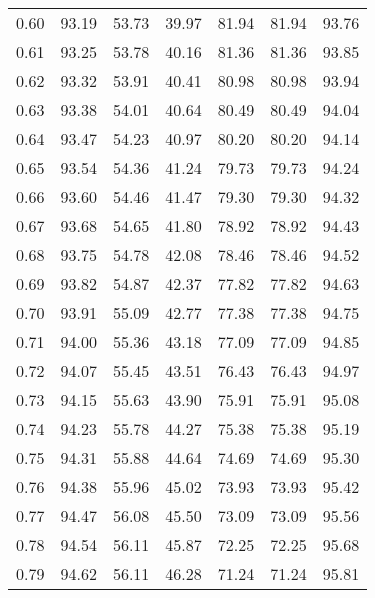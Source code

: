 \begin{tabular}{|c|c|c|c|c|c|c|}
      0.60 &     93.19 &     53.73 &      39.97 &   81.94 &      81.94 &         93.76 \\
      0.61 &     93.25 &     53.78 &      40.16 &   81.36 &      81.36 &         93.85 \\
      0.62 &     93.32 &     53.91 &      40.41 &   80.98 &      80.98 &         93.94 \\
      0.63 &     93.38 &     54.01 &      40.64 &   80.49 &      80.49 &         94.04 \\
      0.64 &     93.47 &     54.23 &      40.97 &   80.20 &      80.20 &         94.14 \\
      0.65 &     93.54 &     54.36 &      41.24 &   79.73 &      79.73 &         94.24 \\
      0.66 &     93.60 &     54.46 &      41.47 &   79.30 &      79.30 &         94.32 \\
      0.67 &     93.68 &     54.65 &      41.80 &   78.92 &      78.92 &         94.43 \\
      0.68 &     93.75 &     54.78 &      42.08 &   78.46 &      78.46 &         94.52 \\
      0.69 &     93.82 &     54.87 &      42.37 &   77.82 &      77.82 &         94.63 \\
      0.70 &     93.91 &     55.09 &      42.77 &   77.38 &      77.38 &         94.75 \\
      0.71 &     94.00 &     55.36 &      43.18 &   77.09 &      77.09 &         94.85 \\
      0.72 &     94.07 &     55.45 &      43.51 &   76.43 &      76.43 &         94.97 \\
      0.73 &     94.15 &     55.63 &      43.90 &   75.91 &      75.91 &         95.08 \\
      0.74 &     94.23 &     55.78 &      44.27 &   75.38 &      75.38 &         95.19 \\
      0.75 &     94.31 &     55.88 &      44.64 &   74.69 &      74.69 &         95.30 \\
      0.76 &     94.38 &     55.96 &      45.02 &   73.93 &      73.93 &         95.42 \\
      0.77 &     94.47 &     56.08 &      45.50 &   73.09 &      73.09 &         95.56 \\
      0.78 &     94.54 &     56.11 &      45.87 &   72.25 &      72.25 &         95.68 \\
      0.79 &     94.62 &     56.11 &      46.28 &   71.24 &      71.24 &         95.81 \\

\end{tabular}
